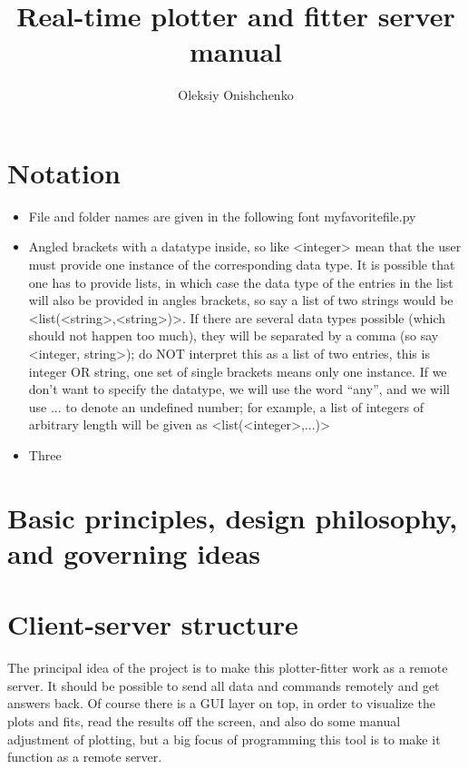 \documentclass[11pt]{article} %
\title{Real-time plotter and fitter server manual}
\author{Oleksiy Onishchenko}
\begin{document}
\maketitle

\section{Notation}

\begin{itemize}
	\item File and folder names are given in the following font { myfavoritefile.py} 
	\item Angled brackets with a datatype inside, so like <integer> mean that the user must provide one instance of the corresponding data type. It is possible that one has to provide lists, in which case the data type of the entries in the list will also be provided in angles brackets, so say a list of two strings would be <list(<string>,<string>)>. If there are several data types possible (which should not happen too much), they will be separated by a comma (so say <integer, string>); do NOT interpret this as a list of two entries, this is integer OR string, one set of single brackets means only one instance. If we don't want to specify the datatype, we will use the word ``any'', and we will use ... to denote an undefined number; for example, a list of integers of arbitrary length will be given as <list(<integer>,...)>
	\item Three
\end{itemize}

\section{Basic principles, design philosophy, and governing ideas}

\section{Client-server structure}

The principal idea of the project is to make this plotter-fitter work as a remote server. It should be possible to send all data and commands remotely and get answers back. Of course there is a GUI layer on top, in order to visualize the plots and fits, read the results off the screen, and also do some manual adjustment of plotting, but a big focus of programming this tool is to make it function as a remote server.
\end{document}
